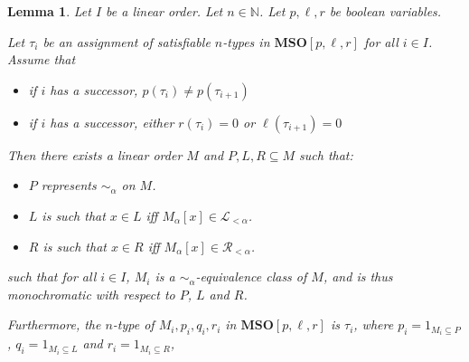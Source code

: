 \documentclass{article}
\newtheorem{lemma}{Lemma}
\newcommand{\mso}{\mathbf{MSO}}
\newcommand{\NN}{\mathbb{N}}
\begin{document}
\begin{lemma}
  Let $I$ be a linear order. Let $n \in \NN$. Let $p, \ell, r$ be boolean variables.

  Let $\tau_i$ be an assignment of satisfiable $n$-types in $\mso[p, \ell, r]$ for all $i \in I$. Assume that
  \begin{itemize}
    \item if $i$ has a successor, $p(\tau_i) \ne p(\tau_{i+1})$
    \item if $i$ has a successor, either $r(\tau_i) = 0$ or $\ell(\tau_{i+1}) = 0$
  \end{itemize}

  Then there exists a linear order $M$ and $P, L, R \subseteq M$ such that:
  \begin{itemize}
    \item $P$ represents $\sim_{\alpha}$ on $M$.
    \item $L$ is such that $x \in L$ iff $M_{\alpha}[x] \in \mathcal{L}_{< \alpha}$.
    \item $R$ is such that $x \in R$ iff $M_{\alpha}[x] \in \mathcal{R}_{< \alpha}$.
  \end{itemize}

  such that for all $i \in I$, $M_i$ is a $\sim_{\alpha}$-equivalence class of $M$,
  and is thus monochromatic with respect to $P$, $L$ and $R$.

  Furthermore, the $n$-type of $M_i, p_i, q_i, r_i$ in $\mso[p, \ell, r]$ is $\tau_i$, where
  $p_i = 1_{M_i \subseteq P}$, $q_i = 1_{M_i \subseteq L}$ and $r_i = 1_{M_i \subseteq R}$,
\end{lemma}
\end{document}
